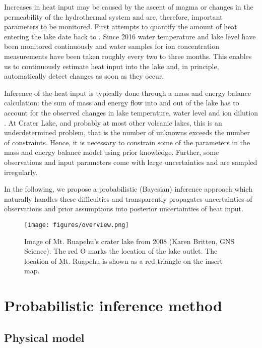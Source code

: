\documentclass{bmc_template/bmcart}
\begin{document}
Increases in heat input may be caused by the ascent of magma or
changes in the permeability of the hydrothermal system and are, therefore,
important parameters to be monitored. First attempts to quantify the amount of
heat entering the lake date back to \citep{Dibble1966}. Since 2016
water temperature and lake level have been monitored continuously
and water samples for ion concentration measurements have been taken roughly
every two to three months. This enables us to continuously estimate heat input
into the lake and, in principle, automatically detect changes as soon as they occur.

Inference of the heat input is typically done through a mass and
energy balance calculation: the sum of mass and energy flow into and out of the
lake has to account for the observed changes in lake temperature, water level
and ion dilution \citep[e.g.,][]{Hurst1981, Hurst1991, Stevenson1992,
Fournier2009, Scott1994}. At Crater Lake, and probably at most other volcanic
lakes, this is an underdetermined problem, that is the number of unknowns
exceeds the number of constraints. Hence, it is necessary to constrain some of
the parameters in the mass and energy balance model using prior knowledge. Further,
some observations and input parameters come with large uncertainties and are sampled
irregularly.

In the following, we propose a probabilistic (Bayesian) inference approach which
naturally handles these difficulties and transparently propagates uncertainties of
observations and prior assumptions into posterior uncertainties of heat input.

\begin{figure}
\texttt{[image: figures/overview.png]}  
\caption{Image of Mt. Ruapehu's crater lake from 2008 (\textcopyright Karen
	Britten, GNS Science). The red O marks the location of the lake outlet. The
	location of Mt. Ruapehu is shown as a red triangle on the insert map.}
  \label{overview}
\end{figure}


\section*{Probabilistic inference method}\label{Pim}

\subsection*{Physical model}\label{phm}
\end{document}
